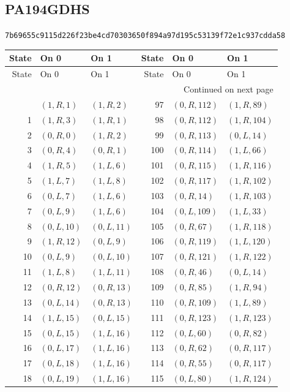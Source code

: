 \subsection{PA194GDHS}
\noindent\small\texttt{7b69655c9115d226f23be4cd70303650f894a97d195c53139f72e1c937cdda58}
\normalsize
\fontsize{9.5}{11}\selectfont
\begin{longtable}{r@{\quad}ll@{\qquad}r@{\quad}ll}
\toprule
State & On 0 & On 1 & State & On 0 & On 1\\
\midrule\endfirsthead
\toprule
State & On 0 & On 1 & State & On 0 & On 1\\
\midrule\endhead
\midrule\multicolumn{6}{r}{Continued on next page}\\\endfoot
\bottomrule\endlastfoot
0 & $(1,R,1)$ & $(1,R,2)$ & 97 & $(0,R,112)$ & $(1,R,89)$\\
1 & $(1,R,3)$ & $(1,R,1)$ & 98 & $(0,R,112)$ & $(1,R,104)$\\
2 & $(0,R,0)$ & $(1,R,2)$ & 99 & $(0,R,113)$ & $(0,L,14)$\\
3 & $(0,R,4)$ & $(0,R,1)$ & 100 & $(0,R,114)$ & $(1,L,66)$\\
4 & $(1,R,5)$ & $(1,L,6)$ & 101 & $(0,R,115)$ & $(1,R,116)$\\
5 & $(1,L,7)$ & $(1,L,8)$ & 102 & $(0,R,117)$ & $(1,R,102)$\\
6 & $(0,L,7)$ & $(1,L,6)$ & 103 & $(0,R,14)$ & $(1,R,103)$\\
7 & $(0,L,9)$ & $(1,L,6)$ & 104 & $(0,L,109)$ & $(1,L,33)$\\
8 & $(0,L,10)$ & $(0,L,11)$ & 105 & $(0,R,67)$ & $(1,R,118)$\\
9 & $(1,R,12)$ & $(0,L,9)$ & 106 & $(0,R,119)$ & $(1,L,120)$\\
10 & $(0,L,9)$ & $(0,L,10)$ & 107 & $(0,R,121)$ & $(1,R,122)$\\
11 & $(1,L,8)$ & $(1,L,11)$ & 108 & $(0,R,46)$ & $(0,L,14)$\\
12 & $(0,R,12)$ & $(0,R,13)$ & 109 & $(0,R,85)$ & $(1,R,94)$\\
13 & $(0,L,14)$ & $(0,R,13)$ & 110 & $(0,R,109)$ & $(1,L,89)$\\
14 & $(1,L,15)$ & $(0,L,15)$ & 111 & $(0,R,123)$ & $(1,R,123)$\\
15 & $(0,L,15)$ & $(1,L,16)$ & 112 & $(0,L,60)$ & $(0,R,82)$\\
16 & $(0,L,17)$ & $(1,L,16)$ & 113 & $(0,R,62)$ & $(0,R,117)$\\
17 & $(0,L,18)$ & $(1,L,16)$ & 114 & $(0,R,55)$ & $(0,R,117)$\\
18 & $(0,L,19)$ & $(1,L,16)$ & 115 & $(0,L,80)$ & $(1,R,124)$\\

\end{longtable}
